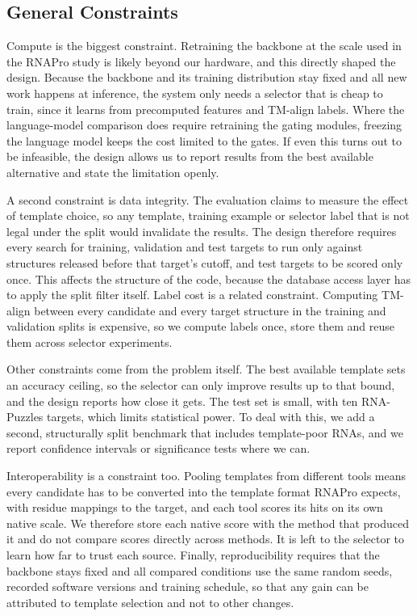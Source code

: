 \documentclass{FastFyp}
\begin{document}
\subsection{General Constraints}
Compute is the biggest constraint. Retraining the backbone at the scale used in the RNAPro study is likely beyond our hardware, and this directly shaped the design. Because the backbone and its training distribution stay fixed and all new work happens at inference, the system only needs a selector that is cheap to train, since it learns from precomputed features and TM-align labels. Where the language-model comparison does require retraining the gating modules, freezing the language model keeps the cost limited to the gates. If even this turns out to be infeasible, the design allows us to report results from the best available alternative and state the limitation openly.

A second constraint is data integrity. The evaluation claims to measure the effect of template choice, so any template, training example or selector label that is not legal under the split would invalidate the results. The design therefore requires every search for training, validation and test targets to run only against structures released before that target's cutoff, and test targets to be scored only once. This affects the structure of the code, because the database access layer has to apply the split filter itself. Label cost is a related constraint. Computing TM-align between every candidate and every target structure in the training and validation splits is expensive, so we compute labels once, store them and reuse them across selector experiments.

Other constraints come from the problem itself. The best available template sets an accuracy ceiling, so the selector can only improve results up to that bound, and the design reports how close it gets. The test set is small, with ten RNA-Puzzles targets, which limits statistical power. To deal with this, we add a second, structurally split benchmark that includes template-poor RNAs, and we report confidence intervals or significance tests where we can.

Interoperability is a constraint too. Pooling templates from different tools means every candidate has to be converted into the template format RNAPro expects, with residue mappings to the target, and each tool scores its hits on its own native scale. We therefore store each native score with the method that produced it and do not compare scores directly across methods. It is left to the selector to learn how far to trust each source. Finally, reproducibility requires that the backbone stays fixed and all compared conditions use the same random seeds, recorded software versions and training schedule, so that any gain can be attributed to template selection and not to other changes.
\end{document}
